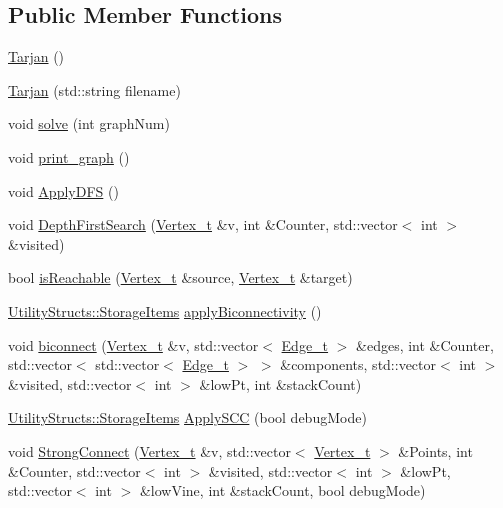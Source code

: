 \subsection*{Public Member Functions}
\begin{DoxyCompactItemize}
\item 
\hyperlink{class_tarjan_a24a7fa59ed2fcff4a520e012e30acb91}{Tarjan} ()
\item 
\hyperlink{class_tarjan_a7e9845c51e1e905df76b267370c6dc00}{Tarjan} (std\+::string filename)
\item 
void \hyperlink{class_tarjan_af94d48b6e78c292bd1aa465d37d89769}{solve} (int graph\+Num)
\item 
void \hyperlink{class_tarjan_a0ef20e22407703c87c880898c8ad5745}{print\+\_\+graph} ()
\item 
void \hyperlink{class_tarjan_a674767d7e49ada6a738ab69187e4836d}{Apply\+D\+FS} ()
\item 
void \hyperlink{class_tarjan_a277c58dc6f712a6ae1ef2e59c9ad58e1}{Depth\+First\+Search} (\hyperlink{class_graph_component_ae67114a6ce5a001dc35e1996e1b45aa0}{Vertex\+\_\+t} \&v, int \&Counter, std\+::vector$<$ int $>$ \&visited)
\item 
bool \hyperlink{class_tarjan_a74f69dfaa1d4cf3bac06aef7a704c0b8}{is\+Reachable} (\hyperlink{class_graph_component_ae67114a6ce5a001dc35e1996e1b45aa0}{Vertex\+\_\+t} \&source, \hyperlink{class_graph_component_ae67114a6ce5a001dc35e1996e1b45aa0}{Vertex\+\_\+t} \&target)
\item 
\hyperlink{struct_utility_structs_1_1_storage_items}{Utility\+Structs\+::\+Storage\+Items} \hyperlink{class_tarjan_a4be3dec188e347b54a90cd5f37abc268}{apply\+Biconnectivity} ()
\item 
void \hyperlink{class_tarjan_a52573be5a4930ad84f3807bc49f42026}{biconnect} (\hyperlink{class_graph_component_ae67114a6ce5a001dc35e1996e1b45aa0}{Vertex\+\_\+t} \&v, std\+::vector$<$ \hyperlink{utilities_8h_af4a84c740ebb77e6a13a00aa289b0018}{Edge\+\_\+t} $>$ \&edges, int \&Counter, std\+::vector$<$ std\+::vector$<$ \hyperlink{utilities_8h_af4a84c740ebb77e6a13a00aa289b0018}{Edge\+\_\+t} $>$ $>$ \&components, std\+::vector$<$ int $>$ \&visited, std\+::vector$<$ int $>$ \&low\+Pt, int \&stack\+Count)
\item 
\hyperlink{struct_utility_structs_1_1_storage_items}{Utility\+Structs\+::\+Storage\+Items} \hyperlink{class_tarjan_a58ad9fcfd599a608fa1671e4607db378}{Apply\+S\+CC} (bool debug\+Mode)
\item 
void \hyperlink{class_tarjan_ac76fd1419a2de2dbf34c6ff1d4cc55e2}{Strong\+Connect} (\hyperlink{class_graph_component_ae67114a6ce5a001dc35e1996e1b45aa0}{Vertex\+\_\+t} \&v, std\+::vector$<$ \hyperlink{class_graph_component_ae67114a6ce5a001dc35e1996e1b45aa0}{Vertex\+\_\+t} $>$ \&Points, int \&Counter, std\+::vector$<$ int $>$ \&visited, std\+::vector$<$ int $>$ \&low\+Pt, std\+::vector$<$ int $>$ \&low\+Vine, int \&stack\+Count, bool debug\+Mode)
\end{DoxyCompactItemize}
